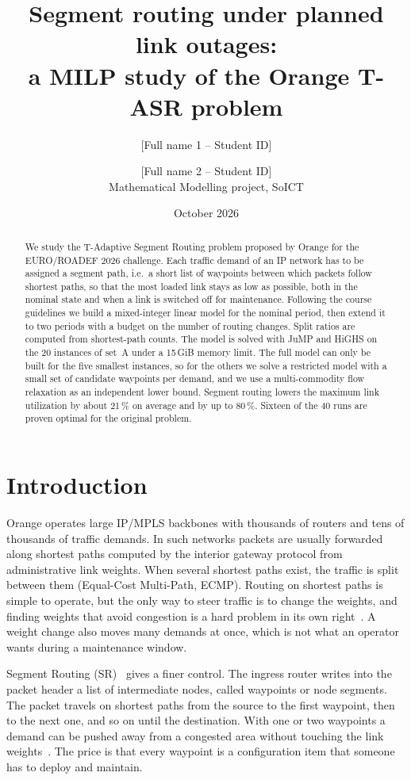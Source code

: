 \documentclass[11pt,a4paper]{article}
\title{Segment routing under planned link outages:\\
a MILP study of the Orange T-ASR problem}
\author{[Full name 1 -- Student ID] \and [Full name 2 -- Student ID]\\[0.3em]
\small Mathematical Modelling project, SoICT}
\date{October 2026}
\begin{document}
\maketitle

\begin{abstract}
\noindent
We study the T-Adaptive Segment Routing problem proposed by Orange for the EURO/ROADEF 2026
challenge. Each traffic demand of an IP network has to be assigned a segment path, i.e.\ a short
list of waypoints between which packets follow shortest paths, so that the most loaded link stays
as low as possible, both in the nominal state and when a link is switched off for maintenance.
Following the course guidelines we build a mixed-integer linear model for the nominal period, then
extend it to two periods with a budget on the number of routing changes. Split ratios are computed
from shortest-path counts. The model is solved with JuMP and HiGHS on the 20 instances of set~A
under a 15\,GiB memory limit. The full model can only be built for the five smallest instances, so
for the others we solve a restricted model with a small set of candidate waypoints per demand, and
we use a multi-commodity flow relaxation as an independent lower bound. Segment routing lowers the
maximum link utilization by about 21\,\% on average and by up to 80\,\%. Sixteen of the 40 runs are
proven optimal for the original problem.
\end{abstract}

\section{Introduction}

Orange operates large IP/MPLS backbones with thousands of routers and tens of thousands of traffic
demands. In such networks packets are usually forwarded along shortest paths computed by the
interior gateway protocol from administrative link weights. When several shortest paths exist, the
traffic is split between them (Equal-Cost Multi-Path, ECMP). Routing on shortest paths is simple to
operate, but the only way to steer traffic is to change the weights, and finding weights that avoid
congestion is a hard problem in its own right~\cite{fortz2000}. A weight change also moves many
demands at once, which is not what an operator wants during a maintenance window.

Segment Routing (SR)~\cite{rfc8402} gives a finer control. The ingress router writes into the
packet header a list of intermediate nodes, called waypoints or node segments. The packet travels
on shortest paths from the source to the first waypoint, then to the next one, and so on until the
destination. With one or two waypoints a demand can be pushed away from a congested area without
touching the link weights~\cite{bhatia2015}. The price is that every waypoint is a configuration
item that someone has to deploy and maintain.
\end{document}
